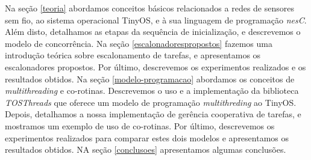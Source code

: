 Na seção \ref{teoria} abordamos conceitos básicos relacionados a redes de sensores sem fio, ao sistema operacional
TinyOS, e à sua linguagem de programação \textit{nesC}. Além disto, detalhamos as etapas da sequência de
inicialização, e descrevemos o modelo de concorrência.
Na seção \ref{escalonadorespropostos} fazemos uma introdução teórica sobre escalonamento de tarefas, e apresentamos os
escalonadores propostos. Por último, descrevemos os experimentos realizados e os resultados obtidos.
Na seção \ref{modelo-programacao} abordamos os conceitos de \textit{multithreading} e co-rotinas. Descrevemos o
uso e a implementação da biblioteca \textit{TOSThreads} que oferece um modelo de programação \textit{multithreding} ao
TinyOS. Depois, detalhamos a nossa implementação de gerência cooperativa de tarefas, e mostramos um exemplo de uso de
co-rotinas. Por último, descrevemos os experimentos realizados para comparar estes dois modelos e apresentamos os
resultados obtidos.
NA seção \ref{conclusoes} apresentamos algumas conclusões.

